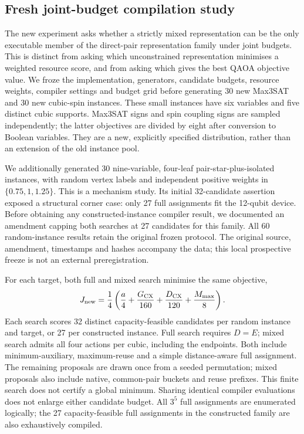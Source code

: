 \subsection{Fresh joint-budget compilation study}
\label{sec:fresh-compiled}

The new experiment asks whether a strictly mixed representation can be the
only executable member of the direct-pair representation family under joint
budgets. This is distinct from asking which unconstrained representation
minimises a weighted resource score, and from asking which gives the best
QAOA objective value. We froze the implementation, generators, candidate
budgets, resource weights, compiler settings and budget grid before generating
30 new Max3SAT and 30 new cubic-spin instances. These small instances have
six variables and five distinct cubic supports. Max3SAT signs and spin
coupling signs are sampled independently; the latter objectives are divided
by eight after conversion to Boolean variables. They are a new, explicitly
specified distribution, rather than an extension of the old instance pool.

We additionally generated 30 nine-variable, four-leaf pair-star-plus-isolated
instances, with random vertex labels and independent positive weights in
$\{0.75,1,1.25\}$. This is a mechanism study. Its initial 32-candidate
assertion exposed a structural corner case: only 27 full assignments fit
the 12-qubit device. Before obtaining any constructed-instance compiler
result, we documented an amendment capping both searches at 27 candidates
for this family. All 60 random-instance results retain the original frozen
protocol. The original source, amendment, timestamps and hashes accompany
the data; this local prospective freeze is not an external preregistration.

For each target, both full and mixed search minimise the same objective,
\begin{equation}
 J_{\rm new}=\frac14\left(\frac{a}{4}+\frac{G_{\rm CX}}{160}
                    +\frac{D_{\rm CX}}{120}+\frac{M_{\max}}{8}\right).
 \label{eq:new-compiled-score}
\end{equation}
Each search scores 32 distinct capacity-feasible candidates per random
instance and target, or 27 per constructed instance. Full search requires
$D=E$; mixed search admits all four actions per cubic, including the
endpoints. Both include minimum-auxiliary, maximum-reuse and a simple
distance-aware full assignment. The remaining proposals are drawn once
from a seeded permutation; mixed proposals also include native, common-pair
buckets and reuse prefixes. This finite search does not certify a global
minimum. Sharing identical compiler evaluations does not enlarge either
candidate budget. All $3^5$ full assignments are enumerated logically;
the 27 capacity-feasible full assignments in the constructed family are
also exhaustively compiled.

